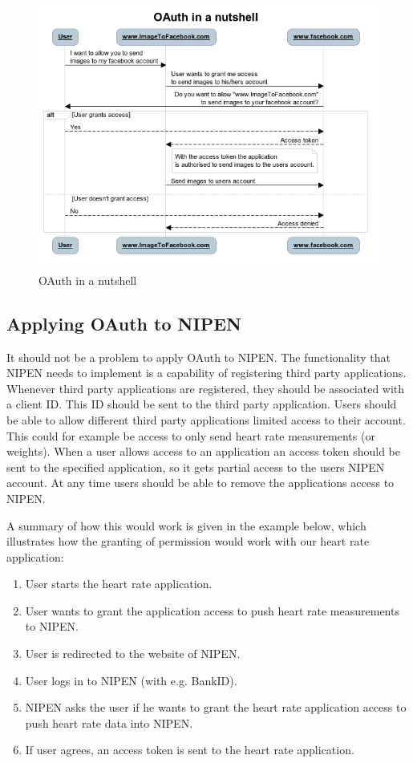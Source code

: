 \begin{figure}[h]
\centering
\includegraphics[scale=1.0]{../Figures/oauth-in-a-nutshell.png}
\caption{OAuth in a nutshell}
\label{figure:oauth-in-a-nutshell}
\end{figure}


\subsection{Applying OAuth to NIPEN}

It should not be a problem to apply OAuth to NIPEN.
The functionality that NIPEN needs to implement is a capability of registering third party applications.
Whenever third party applications are registered, they should be associated with a client ID.
This ID should be sent to the third party application.
Users should be able to allow different third party applications limited access to their account.
This could for example be access to only send heart rate measurements (or weights).
When a user allows access to an application an access token should be sent to the specified application, so it gets partial access to the users NIPEN account.
At any time users should be able to remove the applications access to NIPEN.

A summary of how this would work is given in the example below, which illustrates how the granting of permission would work with our heart rate application:

\begin{enumerate}
\item User starts the heart rate application.
\item User wants to grant the application access to push heart rate measurements to NIPEN.
\item User is redirected to the website of NIPEN.
\item User logs in to NIPEN (with e.g. BankID).
\item NIPEN asks the user if he wants to grant the heart rate application access to push heart rate data into NIPEN.
\item If user agrees, an access token is sent to the heart rate application.
\end{enumerate}

